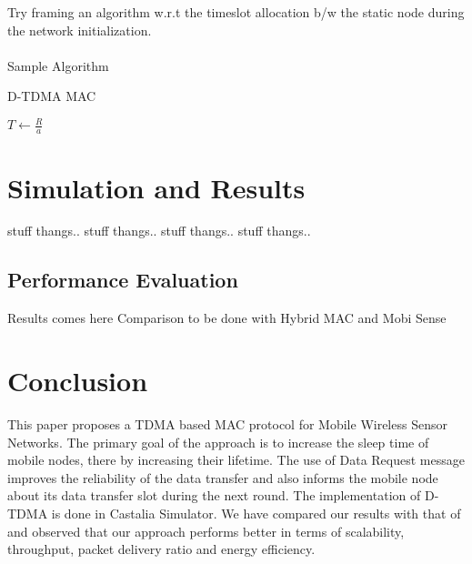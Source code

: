 \documentclass[a4paper, conference, 10pt]{IEEEtran}
\begin{document}
Try framing an algorithm w.r.t the timeslot allocation b/w the static node during the network initialization. \\ \\

Sample Algorithm
\begin{algorithm}[H]
\caption{D-TDMA MAC}
\begin{algorithmic}[1]
    \State $T \leftarrow \frac{R}{a}$
      
\EndProcedure
\end{algorithmic}
\end{algorithm}
\fi
\section{Simulation and Results}
stuff thangs.. stuff thangs..
stuff thangs.. stuff thangs..
\subsection{Performance Evaluation}         

Results comes here
Comparison to be done with Hybrid MAC and Mobi Sense

\section{Conclusion}
This paper proposes a TDMA based MAC protocol for Mobile Wireless Sensor Networks. The primary goal of the approach is to increase the sleep time of mobile nodes, there by increasing their lifetime. The use of Data Request message improves the reliability of the data transfer and also informs the mobile node about its data transfer slot during the next round. The implementation of D-TDMA is done in Castalia Simulator. We have compared our results with that of \cite{hmac} and observed that our approach performs better in terms of scalability, throughput, packet delivery ratio and energy efficiency.



\end{document}
